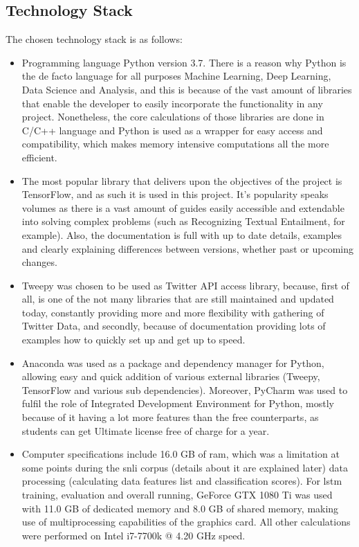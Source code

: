     \subsection{Technology Stack} \label{techstack}
        The chosen technology stack is as follows:
        \begin{itemize}
            \item Programming language Python version 3.7. There is a reason why Python is the de facto language for all purposes Machine Learning, Deep Learning, Data Science and Analysis, and this is because of the vast amount of libraries that enable the developer to easily incorporate the functionality in any project. Nonetheless, the core calculations of those libraries are done in C/C++ language and Python is used as a wrapper for easy access and compatibility, which makes memory intensive computations all the more efficient.
            
            \item The most popular library that delivers upon the objectives of the project is TensorFlow, and as such it is used in this project. It's popularity speaks volumes as there is a vast amount of guides easily accessible and extendable into solving complex problems (such as Recognizing Textual Entailment, for example). Also, the documentation is full with up to date details, examples and clearly explaining differences between versions, whether past or upcoming changes.
            
            \item Tweepy was chosen to be used as Twitter API access library, because, first of all, is one of the not many libraries that are still maintained and updated today, constantly providing more and more flexibility with gathering of Twitter Data, and secondly, because of documentation providing lots of examples how to quickly set up and get up to speed.
            
            \item Anaconda was used as a package and dependency manager for Python, allowing easy and quick addition of various external libraries (Tweepy, TensorFlow and various sub dependencies). Moreover, PyCharm was used to fulfil the role of Integrated Development Environment for Python, mostly because of it having a lot more features than the free counterparts, as students can get Ultimate license free of charge for a year.
            
            \item Computer specifications include 16.0 GB of \gls{ram}, which was a limitation at some points during the \gls{snli} corpus (details about it are explained later) data processing (calculating data features list and classification scores). For \gls{lstm} training, evaluation and overall running, GeForce GTX 1080 Ti was used with 11.0 GB of dedicated memory and 8.0 GB of shared memory, making use of multiprocessing capabilities of the graphics card. All other calculations were performed on Intel i7-7700k @ 4.20 GHz speed.
        \end{itemize}

